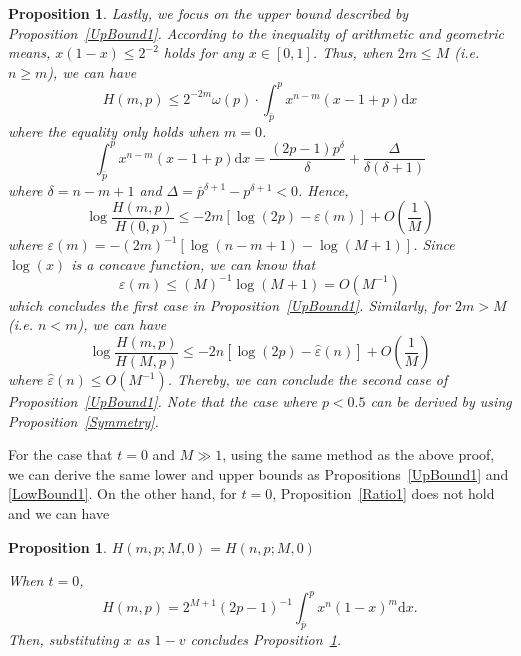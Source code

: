\documentclass{article}
\makeatletter
\newtheorem{proposition}[theorem]{Proposition}
\renewenvironment{proof}[1][\proofname]{\par
  \vspace{-\topsep}%
  \pushQED{\qed}%
  \normalfont
  \topsep0pt \partopsep0pt %
  \trivlist
  \item[\hskip\labelsep
        \itshape
    #1\@addpunct{.}]\ignorespaces
}{%
  \popQED\endtrivlist\@endpefalse
  \addvspace{0pt plus 0pt} %
}
\makeatother
\begin{document}
\begin{proposition}
\begin{proof}
Lastly, we focus on the upper bound described by Proposition~\ref{UpBound1}. According to the inequality of arithmetic and geometric means, $x(1-x)\leq 2^{-2}$ holds for any $x\in [0,1]$. Thus, when $2m\leq M$ (i.e. $n\geq m$), we can have
\begin{equation}
H(m,p)\leq 2^{-2m}\omega(p)\cdot \int_{\bar{p}}^{p}x^{n-m}(x-1+p)\mathrm{d}x
\end{equation}
where the equality only holds when $m=0$.
\begin{equation}
 \int_{\bar{p}}^{p}x^{n-m}(x-1+p)\mathrm{d}x=\frac{(2p-1)p^{\delta}}{\delta}+\frac{\Delta}{\delta(\delta+1)}
\end{equation}
where $\delta=n-m+1$ and $\Delta=\bar{p}^{\delta+1}-p^{\delta+1}<0$. Hence,
\begin{equation}
\log\frac{H(m,p)}{H(0,p)}\leq -2m[\log(2p)-\varepsilon(m)] + O\left(\frac{1}{M}\right)
\end{equation}
where $\varepsilon(m)=-(2m)^{-1}[\log(n-m+1)-\log(M+1)]$. Since $\log(x)$ is a concave function, we can know that
\begin{equation}
\varepsilon(m)\leq (M)^{-1}\log(M+1)=O\left(M^{-1}\right)
\end{equation}
which concludes the first case in Proposition~\ref{UpBound1}. Similarly, for $2m>M$ (i.e. $n<m$), we can have
\begin{equation}
\log\frac{H(m,p)}{H(M,p)}\leq -2n[\log(2p)-\hat{\varepsilon}(n)] + O\left(\frac{1}{M}\right)
\end{equation}
where $\hat{\varepsilon}(n)\leq O(M^{-1})$. Thereby, we can conclude the second case of Proposition~\ref{UpBound1}. Note that the case where $p<0.5$ can be derived by using Proposition~\ref{Symmetry}.
\end{proof}
\end{proposition}
For the case that $t=0$ and $M\gg 1$, using the same method as the above proof, we can derive the same lower and upper bounds as Propositions~\ref{UpBound1} and \ref{LowBound1}. On the other hand, for $t=0$, Proposition~\ref{Ratio1} does not hold and we can have
\begin{proposition}
\label{Ratio0}
$H(m,p;M,0)=H(n,p;M,0)$
\begin{proof}
When $t=0$,
\begin{equation}
H(m,p)=2^{M+1}(2p-1)^{-1}\int_{\bar{p}}^{p}x^n(1-x)^m\mathrm{d}x.
\end{equation}
Then, substituting $x$ as $1-v$ concludes Proposition~\ref{Ratio0}.
\end{proof}
\end{proposition}





\end{document}
